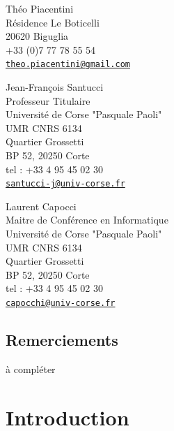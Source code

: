 \documentclass{rapport_stage}
\begin{document}
\maketitle
{}

\cleardoublepage

Théo Piacentini \\
Résidence Le Boticelli \\
20620 Biguglia \\
+33 (0)7 77 78 55 54 \\
\href{mailto:theo.piacentini@gmail.com}{\nolinkurl{theo.piacentini@gmail.com}}

\smallskip

Jean-François Santucci \\
Professeur Titulaire \\
Université de Corse "Pasquale Paoli"\\
UMR CNRS 6134\\
Quartier Grossetti\\
BP 52, 20250 Corte\\
tel : +33 4 95 45 02 30\\
\href{mailto:santucci-j@univ-corse.fr}{\nolinkurl{santucci-j@univ-corse.fr}}

\smallskip

Laurent Capocci \\
Maitre de Conférence en Informatique \\
Université de Corse "Pasquale Paoli"\\
UMR CNRS 6134\\
Quartier Grossetti\\
BP 52, 20250 Corte\\
tel : +33 4 95 45 02 30\\
\href{mailto:capocchi@univ-corse.fr}{\nolinkurl{capocchi@univ-corse.fr}}

\cleardoublepage
{}
\section*{Remerciements}

{\color{green}
  à compléter
}

\clearpage

\renewcommand{\baselinestretch}{0.5}\normalsize
\tableofcontents
\renewcommand{\baselinestretch}{1.0}\normalsize
\cleardoublepage

\setcounter{page}{1}

\chapter*{Introduction}  %
\end{document}
